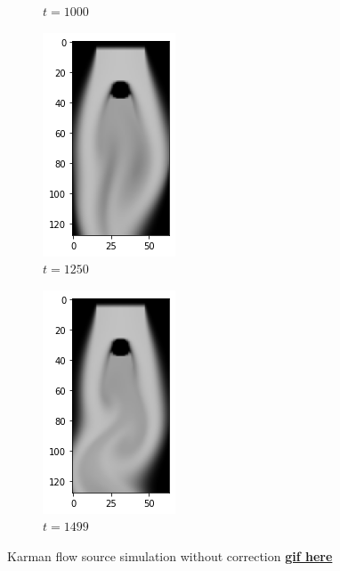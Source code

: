 \documentclass[a4paper,12pt,twoside]{report}
\begin{document}
\begin{figure}
\begin{subfigure}{0.18\textwidth}
		\caption{$t=1000$}
	\end{subfigure}
	\begin{subfigure}{0.18\textwidth}
		\centering
		\includegraphics[scale=0.5]{karmanflow/source_density_001250.png}
		\caption{$t=1250$}
	\end{subfigure}
	\begin{subfigure}{0.18\textwidth}
		\centering
		\includegraphics[scale=0.5]{karmanflow/source_density_001499.png}
		\caption{$t=1499$}
	\end{subfigure}
	\caption{Karman flow source simulation without correction  \href{https://github.com/w191444052/sol-data/blob/master/karman_high/source.gif}{\bf{gif here}}}
	\label{sol karman high source}
\end{figure}
\end{document}
